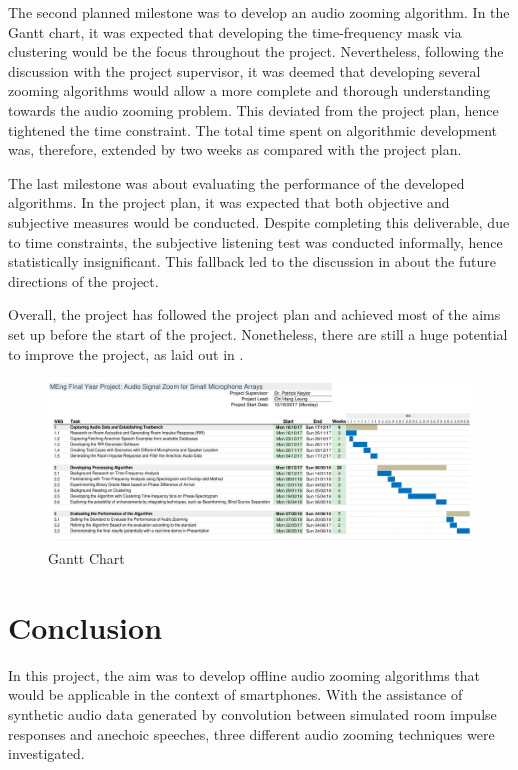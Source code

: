 \documentclass[a4paper,twoside,12pt,hidelinks]{article}
\begin{document}
The second planned milestone was to develop an audio zooming algorithm. In the Gantt chart, it was expected that developing the time-frequency mask via clustering would be the focus throughout the project. Nevertheless, following the discussion with the project supervisor, it was deemed that developing several zooming algorithms would allow a more complete and thorough understanding towards the audio zooming problem. This deviated from the project plan, hence tightened the time constraint. The total time spent on algorithmic development was, therefore, extended by two weeks as compared with the project plan.

The last milestone was about evaluating the performance of the developed algorithms. In the project plan, it was expected that both objective and subjective measures would be conducted. Despite completing this deliverable, due to time constraints, the subjective listening test was conducted informally, hence statistically insignificant. This fallback led to the discussion in  about the future directions of the project.

Overall, the project has followed the project plan and achieved most of the aims set up before the start of the project. Nonetheless, there are still a huge potential to improve the project, as laid out in .

\begin{landscape}
\begin{figure}[H]
\centering
\includegraphics[width=\linewidth,frame]{gantt}
\caption{Gantt Chart}
\label{fig:gantt}
\end{figure}
\clearpage
\end{landscape}

\newpage
\lhead{\itshape\nouppercase{\thesubsection~~\Subsectionname}}
\section{Conclusion}
\label{sect:conclusion}
In this project, the aim was to develop offline audio zooming algorithms that would be applicable in the context of smartphones. With the assistance of synthetic audio data generated by convolution between simulated room impulse responses and anechoic speeches, three different audio zooming techniques were investigated.
\end{document}
